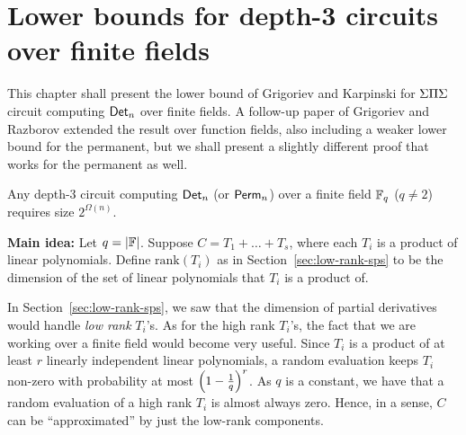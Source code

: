\chapter{Lower bounds for depth-3 circuits over finite fields}\label{chap:GK}

This chapter shall present the lower bound of Grigoriev and Karpinski \cite{grigoriev98} for $\Sigma\Pi\Sigma$ circuit computing $\mathsf{Det}_n$ over finite fields. A follow-up paper of Grigoriev and Razborov \cite{gr00} extended the result over function fields, also including a weaker lower bound for the permanent, but we shall present a slightly different proof that works for the permanent as well.

\begin{theorem}\cite{grigoriev98}\label{thm:gk-main-thm}
  Any depth-3 circuit computing $\mathsf{Det}_n$ (or $\mathsf{Perm}_n$) over a finite field $\mathbb{F}_q$ ($q\neq 2$) requires size $2^{\Omega(n)}$.
\end{theorem}

{\bf Main idea:} Let $q = |\mathbb{F}|$. Suppose $C = T_1 + \dots + T_s$, where each $T_i$ is a product of linear polynomials. Define $\mathrm{rank}(T_i)$ as in Section~\ref{sec:low-rank-sps} to be the dimension of the set of linear polynomials that $T_i$ is a product of.

In Section~\ref{sec:low-rank-sps}, we saw that the dimension of partial derivatives would handle \emph{low rank} $T_i$'s. As for the high rank $T_i$'s, the fact that we are working over a finite field would become very useful. Since $T_i$ is a product of at least $r$ linearly independent linear polynomials, a random evaluation keeps $T_i$ non-zero with probability at most $\left(1-\frac{1}{q}\right)^r$. As $q$ is a constant, we have that a random evaluation of a high rank $T_i$ is almost always zero. Hence, in a sense, $C$ can be ``approximated'' by just the low-rank components.


